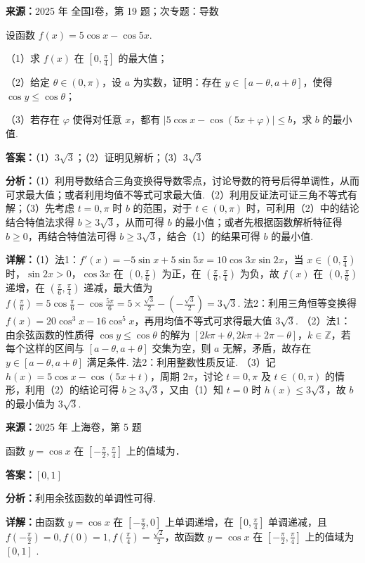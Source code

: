 \begin{question}[points=17]
\textbf{来源：}2025 年 全国I卷，第 19 题；次专题：导数\par
设函数 $f(x) = 5\cos x - \cos 5x$.



（1）求 $f(x)$ 在 $\left[0, \frac{\pi}{4}\right]$ 的最大值；



（2）给定 $\theta \in (0,\pi)$，设 $a$ 为实数，证明：存在 $y \in [a-\theta, a+\theta]$，使得 $\cos y \le \cos \theta$；



（3）若存在 $\varphi$ 使得对任意 $x$，都有 $|5\cos x - \cos(5x+\varphi)| \le b$，求 $b$ 的最小值.
\begin{solution}
\textbf{答案：}（1）$3\sqrt{3}$；（2）证明见解析；（3）$3\sqrt{3}$

\textbf{分析：}（1）利用导数结合三角变换得导数零点，讨论导数的符号后得单调性，从而可求最大值；或者利用均值不等式可求最大值.（2）利用反证法可证三角不等式有解；（3）先考虑 $t=0,\pi$ 时 $b$ 的范围，对于 $t \in (0,\pi)$ 时，可利用（2）中的结论结合特值法求得 $b \ge 3\sqrt{3}$，从而可得 $b$ 的最小值；或者先根据函数解析特征得 $b \ge 0$，再结合特值法可得 $b \ge 3\sqrt{3}$，结合（1）的结果可得 $b$ 的最小值.

\textbf{详解：}（1）法1：$f'(x) = -5\sin x + 5\sin 5x = 10\cos 3x \sin 2x$，当 $x \in (0,\frac{\pi}{4})$ 时，$\sin 2x > 0$，$\cos 3x$ 在 $(0,\frac{\pi}{6})$ 为正，在 $(\frac{\pi}{6},\frac{\pi}{4})$ 为负，故 $f(x)$ 在 $(0,\frac{\pi}{6})$ 递增，在 $(\frac{\pi}{6},\frac{\pi}{4})$ 递减，最大值为 $f(\frac{\pi}{6}) = 5\cos\frac{\pi}{6} - \cos\frac{5\pi}{6} = 5\times\frac{\sqrt{3}}{2} - (-\frac{\sqrt{3}}{2}) = 3\sqrt{3}$. 法2：利用三角恒等变换得 $f(x)=20\cos^3 x - 16\cos^5 x$，再用均值不等式可求得最大值 $3\sqrt{3}$.
（2）法1：由余弦函数的性质得 $\cos y \le \cos\theta$ 的解为 $[2k\pi+\theta, 2k\pi+2\pi-\theta]$，$k \in \mathbb{Z}$，若每个这样的区间与 $[a-\theta, a+\theta]$ 交集为空，则 $a$ 无解，矛盾，故存在 $y \in [a-\theta, a+\theta]$ 满足条件. 法2：利用整数性质反证.
（3）记 $h(x)=5\cos x - \cos(5x+t)$，周期 $2\pi$，讨论 $t=0,\pi$ 及 $t \in (0,\pi)$ 的情形，利用（2）的结论可得 $b \ge 3\sqrt{3}$，又由（1）知 $t=0$ 时 $h(x) \le 3\sqrt{3}$，故 $b$ 的最小值为 $3\sqrt{3}$.
\end{solution}
\end{question}

\begin{question}[points=4]
\textbf{来源：}2025 年 上海卷，第 5 题\par
函数 $y = \cos x$ 在 $\left[-\frac{\pi}{2}, \frac{\pi}{4}\right]$ 上的值域为．
\fillin[{$[0,1]$}]
\begin{solution}
\textbf{答案：}$[0,1]$

\textbf{分析：}利用余弦函数的单调性可得.

\textbf{详解：}由函数 $y = \cos x$ 在 $\left[-\frac{\pi}{2}, 0\right]$ 上单调递增，在 $\left[0, \frac{\pi}{4}\right]$ 单调递减，且 $f(-\frac{\pi}{2}) = 0, f(0) = 1, f(\frac{\pi}{4}) = \frac{\sqrt{2}}{2}$，故函数 $y = \cos x$ 在 $\left[-\frac{\pi}{2}, \frac{\pi}{4}\right]$ 上的值域为 $[0,1]$ .
\end{solution}
\end{question}


